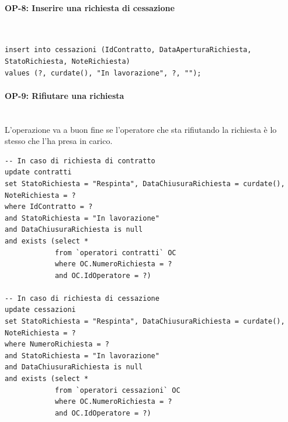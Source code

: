 \documentclass[a4paper,12pt]{report}
\begin{document}
\paragraph{OP-8: Inserire una richiesta di cessazione}\mbox{}\\
\begin{lstlisting}
insert into cessazioni (IdContratto, DataAperturaRichiesta, StatoRichiesta, NoteRichiesta)
values (?, curdate(), "In lavorazione", ?, "");
\end{lstlisting}

\paragraph{OP-9: Rifiutare una richiesta}\mbox{}\\
L'operazione va a buon fine se l'operatore che sta rifiutando la richiesta è lo stesso che l'ha presa in carico.
\begin{lstlisting}
-- In caso di richiesta di contratto
update contratti
set StatoRichiesta = "Respinta", DataChiusuraRichiesta = curdate(), NoteRichiesta = ?
where IdContratto = ?
and StatoRichiesta = "In lavorazione"
and DataChiusuraRichiesta is null
and exists (select *
            from `operatori contratti` OC
            where OC.NumeroRichiesta = ?
            and OC.IdOperatore = ?)

-- In caso di richiesta di cessazione
update cessazioni
set StatoRichiesta = "Respinta", DataChiusuraRichiesta = curdate(), NoteRichiesta = ?
where NumeroRichiesta = ?
and StatoRichiesta = "In lavorazione"
and DataChiusuraRichiesta is null
and exists (select *
            from `operatori cessazioni` OC
            where OC.NumeroRichiesta = ?
            and OC.IdOperatore = ?)
\end{lstlisting}
\end{document}
